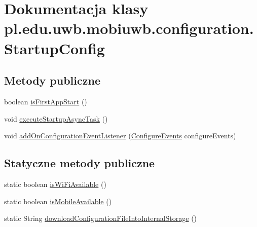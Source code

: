 \hypertarget{classpl_1_1edu_1_1uwb_1_1mobiuwb_1_1configuration_1_1_startup_config}{}\section{Dokumentacja klasy pl.\+edu.\+uwb.\+mobiuwb.\+configuration.\+Startup\+Config}
\label{classpl_1_1edu_1_1uwb_1_1mobiuwb_1_1configuration_1_1_startup_config}
\subsection*{Metody publiczne}
\begin{DoxyCompactItemize}
\item 
boolean \hyperlink{classpl_1_1edu_1_1uwb_1_1mobiuwb_1_1configuration_1_1_startup_config_a55b1f75d60bc6b5e4a3b50906cf6ef8d}{is\+First\+App\+Start} ()
\item 
void \hyperlink{classpl_1_1edu_1_1uwb_1_1mobiuwb_1_1configuration_1_1_startup_config_a3e21bdf9e381f1a8fb574b19766694a0}{execute\+Startup\+Async\+Task} ()
\item 
void \hyperlink{classpl_1_1edu_1_1uwb_1_1mobiuwb_1_1configuration_1_1_startup_config_add0beb9b56bba873f8a6e2e2b63c7a31}{add\+On\+Configuration\+Event\+Listener} (\hyperlink{interfacepl_1_1edu_1_1uwb_1_1mobiuwb_1_1configuration_1_1_configure_events}{Configure\+Events} configure\+Events)
\end{DoxyCompactItemize}
\subsection*{Statyczne metody publiczne}
\begin{DoxyCompactItemize}
\item 
static boolean \hyperlink{classpl_1_1edu_1_1uwb_1_1mobiuwb_1_1configuration_1_1_startup_config_a480861c4a10f86387fb420869fa53c91}{is\+Wi\+Fi\+Available} ()
\item 
static boolean \hyperlink{classpl_1_1edu_1_1uwb_1_1mobiuwb_1_1configuration_1_1_startup_config_a0a94d7d51fd7fa3e3e76b88b0eccf067}{is\+Mobile\+Available} ()
\item 
static String \hyperlink{classpl_1_1edu_1_1uwb_1_1mobiuwb_1_1configuration_1_1_startup_config_abdff51f318abea6cf97b026b5cc49bac}{download\+Configuration\+File\+Into\+Internal\+Storage} ()
\end{DoxyCompactItemize}
